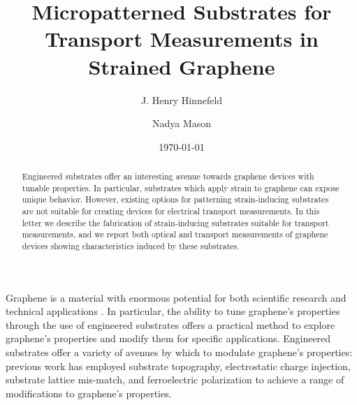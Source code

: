 \documentclass[%
 aip,
 apl,%
 amsmath,amssymb,
 reprint,%
]{revtex4-1}
\begin{document}

\title[Micropatterned Substrates for Transport Measurements in Strained Graphene]{Micropatterned Substrates for Transport Measurements in Strained Graphene}

\author{J. Henry Hinnefeld}
\author{Nadya Mason}
 
\date{\today}

\begin{abstract}
Engineered substrates offer an interesting avenue towards graphene devices with tunable properties.
In particular, substrates which apply strain to graphene can expose unique behavior.
However, existing options for patterning strain-inducing substrates are not suitable for creating 
devices for electrical transport measurements.
In this letter we describe the fabrication of strain-inducing substrates suitable for transport measurements,
and we report both optical and transport measurements of graphene devices showing characteristics induced by these substrates.
\end{abstract}


\maketitle




Graphene is a material with enormous potential for both scientific research and technical applications
\cite{novoselov2004electric,novoselov2005two,zhang2005experimental,geim2007rise}.
In particular, the ability to tune graphene's properties through the use of engineered substrates offers a practical
method to explore graphene's properties and modify them for specific applications\cite{guinea2010energy, zhou2007substrate}.
Engineered substrates offer a variety of avenues by which to modulate graphene's properties:
previous work has employed substrate topography\cite{Tomori2011},
electrostatic charge injection\cite{chiu2010controllable},
substrate lattice mis-match\cite{zhou2007substrate},
and ferroelectric polarization\cite{hinnefeld2016single}
to achieve a range of modifications to graphene's properties.
\end{document}
